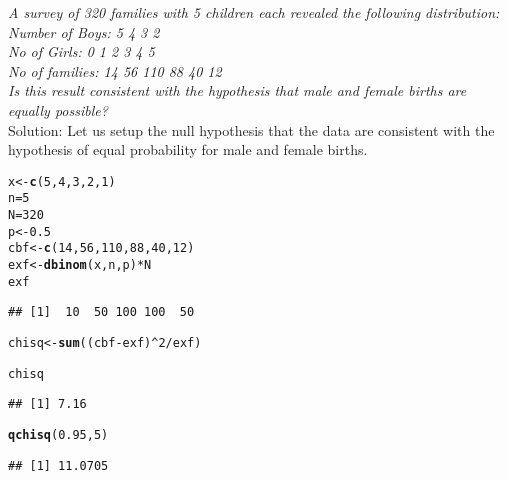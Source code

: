 \documentclass{article}\usepackage[]{graphicx}\usepackage[]{xcolor}
\makeatletter
\newcommand{\hlnum}[1]{\textcolor[rgb]{0.686,0.059,0.569}{#1}}%
\newcommand{\hlopt}[1]{\textcolor[rgb]{0,0,0}{#1}}%
\newcommand{\hldef}[1]{\textcolor[rgb]{0.345,0.345,0.345}{#1}}%
\newcommand{\hlkwb}[1]{\textcolor[rgb]{0.69,0.353,0.396}{#1}}%
\newcommand{\hlkwd}[1]{\textcolor[rgb]{0.737,0.353,0.396}{\textbf{#1}}}%
\newenvironment{kframe}{%
 \def\at@end@of@kframe{}%
 \ifinner\ifhmode%
  \def\at@end@of@kframe{\end{minipage}}%
  \begin{minipage}{\columnwidth}%
 \fi\fi%
 \def\FrameCommand##1{\hskip\@totalleftmargin \hskip-\fboxsep
 \colorbox{shadecolor}{##1}\hskip-\fboxsep
     \hskip-\linewidth \hskip-\@totalleftmargin \hskip\columnwidth}%
 \MakeFramed {\advance\hsize-\width
   \@totalleftmargin\z@ \linewidth\hsize
   \@setminipage}}%
 {\par\unskip\endMakeFramed%
 \at@end@of@kframe}
\newenvironment{knitrout}{}{} %
\makeatother
\begin{document}
\emph{A survey of 320 families with 5 children each revealed the following distribution:\\
Number of Boys:
5
4
3
2\\
No of Girls:
0
1
2
3
4
5\\
No of families:
14 56 110
88  40  12\\
Is this result consistent with the hypothesis that male and female births are equally possible?
}\\
Solution:
Let us setup the null hypothesis that the data are consistent with the hypothesis of equal probability for male and female births.
\begin{knitrout}
\color{fgcolor}\begin{kframe}
\begin{alltt}
\hldef{x} \hlkwb{<-} \hlkwd{c}\hldef{(}\hlnum{5}\hldef{,} \hlnum{4}\hldef{,} \hlnum{3}\hldef{,} \hlnum{2} \hldef{,}\hlnum{1}\hldef{)}
\hldef{n}\hlkwb{=}\hlnum{5}
\hldef{N}\hlkwb{=}\hlnum{320}
\hldef{p} \hlkwb{<-} \hlnum{0.5}
\hldef{cbf} \hlkwb{<-} \hlkwd{c}\hldef{(}\hlnum{14}\hldef{,} \hlnum{56}\hldef{,} \hlnum{110}\hldef{,} \hlnum{88}\hldef{,} \hlnum{40}\hldef{,} \hlnum{12}\hldef{)}
\hldef{exf} \hlkwb{<-} \hlkwd{dbinom}\hldef{(x, n, p)}\hlopt{*}\hldef{N}
\hldef{exf}
\end{alltt}
\begin{verbatim}
## [1]  10  50 100 100  50
\end{verbatim}
\begin{alltt}
\hldef{chisq} \hlkwb{<-} \hlkwd{sum}\hldef{((cbf}\hlopt{-}\hldef{exf)}\hlopt{^}\hlnum{2}\hlopt{/}\hldef{exf)}
\end{alltt}


{\ttfamily\noindent\color{warningcolor}{\#\# Warning in cbf - exf: longer object length is not a multiple of shorter object length}}

{\ttfamily\noindent{}}\begin{alltt}
\hldef{chisq}
\end{alltt}
\begin{verbatim}
## [1] 7.16
\end{verbatim}
\begin{alltt}
\hlkwd{qchisq}\hldef{(}\hlnum{0.95}\hldef{,} \hlnum{5}\hldef{)}
\end{alltt}
\begin{verbatim}
## [1] 11.0705
\end{verbatim}
\end{kframe}
\end{knitrout}
\end{document}
